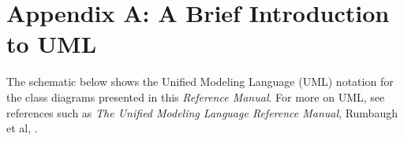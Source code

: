 %

\section{Appendix A:  A Brief Introduction to UML}

The schematic below shows the Unified Modeling Language (UML) notation 
for the class diagrams presented in this {\it Reference Manual}.  For 
more on UML, see references such as {\it The Unified Modeling Language 
Reference Manual}, Rumbaugh et al, \cite{uml}.


\begin{center}
\end{center}


